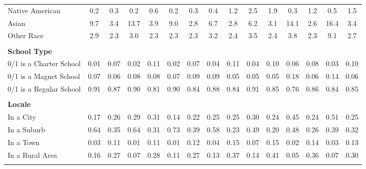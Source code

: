 \begin{tabular*}{\linewidth}{@{\extracolsep{\fill} } lcccccccccccccc}
\hspace{0.2cm}Native American&0.2&0.3&0.2&0.6&0.2&0.3&0.4&1.2&2.5&1.9&0.3&1.2&0.5&1.5\\%
\hspace{0.2cm}Asian&9.7&3.4&13.7&3.9&9.0&2.8&6.7&2.8&6.2&3.1&14.1&2.6&16.4&3.4\\%
\hspace{0.2cm}Other Race&2.9&2.3&3.0&2.3&2.3&2.3&3.2&2.4&3.5&2.4&3.8&2.3&9.1&2.7\\%
&&&&&&&&&&&&&&\\%
\multicolumn{15}{l}{\bfseries School Type}\\%
\hspace{0.2cm}0/1 is a Charter School&0.01&0.07&0.02&0.11&0.02&0.07&0.04&0.11&0.04&0.10&0.06&0.08&0.03&0.10\\%
\hspace{0.2cm}0/1 is a Magnet School&0.07&0.06&0.08&0.08&0.07&0.09&0.09&0.05&0.05&0.05&0.18&0.06&0.14&0.06\\%
\hspace{0.2cm}0/1 is a Regular School&0.91&0.87&0.90&0.81&0.90&0.84&0.88&0.84&0.91&0.85&0.76&0.86&0.84&0.85\\%
&&&&&&&&&&&&&&\\%
\multicolumn{15}{l}{\bfseries Locale}\\%
\hspace{0.2cm}In a City&0.17&0.26&0.29&0.31&0.14&0.22&0.25&0.25&0.30&0.24&0.45&0.24&0.51&0.25\\%
\hspace{0.2cm}In a Suburb&0.64&0.35&0.64&0.31&0.73&0.39&0.58&0.23&0.49&0.20&0.48&0.26&0.39&0.32\\%
\hspace{0.2cm}In a Town&0.03&0.11&0.01&0.11&0.01&0.12&0.04&0.15&0.07&0.15&0.02&0.14&0.03&0.13\\%
\hspace{0.2cm}In a Rural Area&0.16&0.27&0.07&0.28&0.11&0.27&0.13&0.37&0.14&0.41&0.05&0.36&0.07&0.30\\%
&&&&&&&&&&&&&&\\%
\hline%
\end{tabular*}
